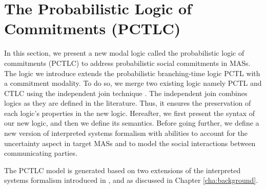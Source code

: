 \section{The Probabilistic Logic of Commitments (PCTLC)}\label{sec:PCTLC}

In this section, we present a new modal logic called the probabilistic logic of commitments (PCTLC) to address probabilistic social commitments in MASs. The logic we introduce extends the probabilistic branching-time logic PCTL \cite{Hansson1994} with a commitment modality. To do so, we merge two existing logic namely PCTL \cite{Hansson1994} and CTLC \cite{Bentahar2012,El-Menshawy2013a} using the independent join technique \cite{Franceschet2004}. The independent join combines logics as they are defined in the literature. Thus, it ensures the preservation of each logic's properties in the new logic. Hereafter, we first present the syntax of our new logic, and then we define its semantics. Before going further, we define a new version of interpreted systems formalism with abilities to account for the uncertainty aspect in target MASs and to model the social interactions between communicating parties.

The PCTLC model is generated based on two extensions of the interpreted systems formalism \cite{Fagin1995} introduced in \cite{Bentahar2012,El-Menshawy2013a}, and \cite{Halpern2003,Wan2013} as discussed in Chapter \ref{cha:background}.

